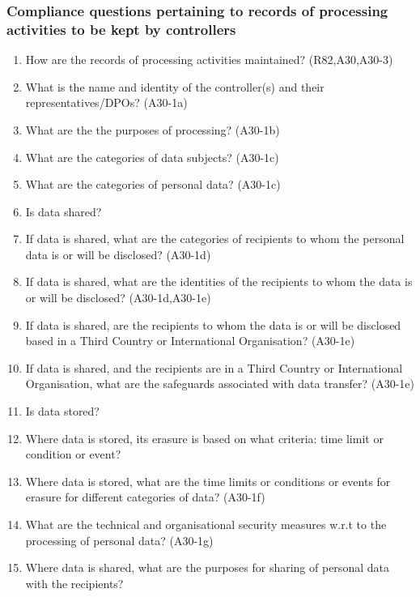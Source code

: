 \subsubsection{Compliance questions pertaining to records of processing activities to be kept by controllers}\label{sec:info:CQ:1}
\begin{enumerate}[label={\textit{CMQ.\theenumi}}]
    \item How are the records of processing activities maintained? (R82,A30,A30-3)
    \item What is the name and identity of the controller(s) and their representatives/DPOs? (A30-1a)
    \item What are the the purposes of processing? (A30-1b)
    \item What are the categories of data subjects? (A30-1c)
    \item What are the categories of personal data? (A30-1c)
    \item Is data shared?
    \item If data is shared, what are the categories of recipients to whom the personal data is or will be disclosed? (A30-1d)
    \item If data is shared, what are the identities of the recipients to whom the data is or will be disclosed? (A30-1d,A30-1e)
    \item If data is shared, are the recipients to whom the data is or will be disclosed based in a Third Country or International Organisation? (A30-1e)
    \item If data is shared, and the recipients are in a Third Country or International Organisation, what are the safeguards associated with data transfer? (A30-1e)
    \item Is data stored?
    \item Where data is stored, its erasure is based on what criteria: time limit or condition or event?
    \item Where data is stored, what are the time limits or conditions or events for erasure for different categories of data? (A30-1f)
    \item What are the technical and organisational security measures w.r.t to the processing of personal data? (A30-1g)
    \item Where data is shared, what are the purposes for sharing of personal data with the recipients?
\end{enumerate}

